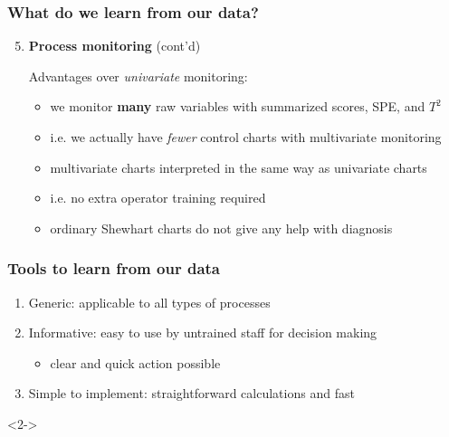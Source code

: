 \begin{frame}\frametitle{What do we learn from our data?}

\begin{enumerate}
	\setcounter{enumi}{4}
	\item 	{\bf \color{myGreen}Process monitoring} (cont'd)	

	\vspace{10pt}	
			Advantages over \emph{univariate} monitoring:
		
			\begin{itemize}
				\item 	we monitor \textbf{many} raw variables with summarized scores, SPE, and \( T^2 \)
				\item 	i.e. we actually have \emph{fewer} control charts with multivariate monitoring
				\item 	multivariate charts interpreted in the same way as univariate charts
				\item 	i.e. no extra operator training required
				\item 	ordinary Shewhart charts do not give any help with diagnosis
			\end{itemize}	
\end{enumerate}
\end{frame}

\begin{frame}\frametitle{Tools to learn from our data}

\begin{enumerate}
	\item 	\alert{Generic}: applicable to all types of processes
	\item 	\alert{Informative}: easy to use by untrained staff for decision making
		\begin{itemize}
			\item clear and quick action possible
		\end{itemize}
	\item 	\alert{Simple to implement}: straightforward calculations and fast
\end{enumerate}

\vspace{1cm}

\begin{exampleblock}{}<2->
\end{exampleblock}
\end{frame}

